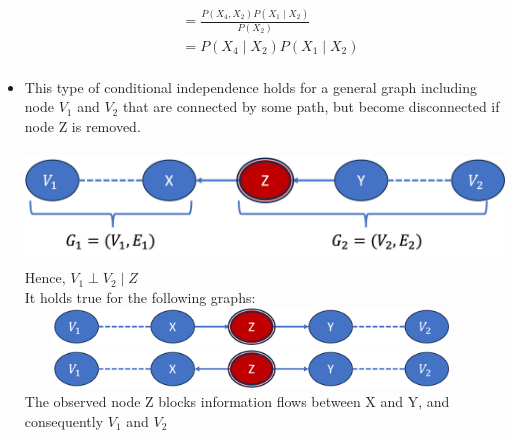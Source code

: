 \documentclass[11pt,a4paper]{report}
\begin{document}
\begin{itemize}
\begin{center}
\begin{equation}
\begin{split}
        & = \frac{P(X_{4},X_{2})P(X_{1} \mid X_{2})}{P(X_{2})} \\
        & = P(X_{4} \mid X_{2})P(X_{1} \mid X_{2}) \\
    \end{split}
    \end{equation}
    \end{center}
    \item This type of conditional independence holds for a general graph including node $V_{1}$ and $V_{2}$ that are connected by some path, but become disconnected if node Z is removed.
    \begin{center}
        \includegraphics[width = 15cm, height = 3cm]{global_indep2.png}\\
        \vspace{0.5cm}
        Hence, $V_{1} \perp V_{2} \mid Z$ \\
        \vspace{0.5cm}
        It holds true for the following graphs:\\
        \vspace{0.5cm}
        \includegraphics[width = 12cm, height = 1cm]{global_indep3.png}\\
        \vspace{0.5cm}
        \includegraphics[width = 12cm, height = 1cm]{global_indep4.png}\\
        The observed node Z blocks information flows between X and Y, and consequently $V_{1}$ and $V_{2}$
    \end{center}


\end{itemize}
\end{document}
